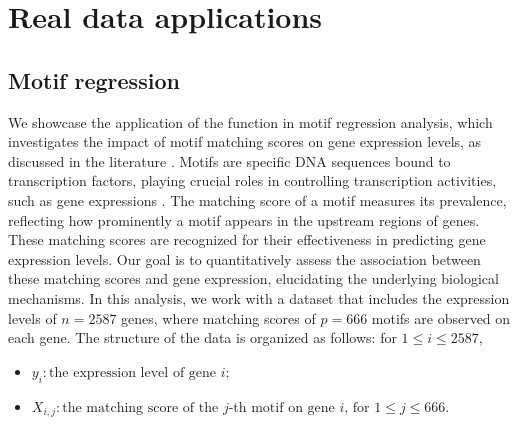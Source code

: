 
\section{Real data applications}
\label{sec: real data}

\subsection{Motif regression}
We showcase the application of the  function in motif regression analysis, which investigates the impact of motif matching scores on gene expression levels, as discussed in the literature \citep{beer2004predicting, conlon2003integrating, das2004interacting, yuan2007predicting}. Motifs are specific DNA sequences bound to transcription factors, playing crucial roles in controlling transcription activities, such as gene expressions \citep{yuan2007predicting}. The matching score of a motif measures its prevalence, reflecting how prominently a motif appears in the upstream regions of genes. These matching scores are recognized for their effectiveness in predicting gene expression levels. Our goal is to quantitatively assess the association between these matching scores and gene expression, elucidating the underlying biological mechanisms. In this analysis, we work with a dataset that includes the expression levels of $n=2587$ genes, where matching scores of $p=666$ motifs are observed on each gene. The structure of the data is organized as follows: for $1\leq i\leq 2587$,
\begin{itemize}
    \item $y_i: \textrm{the expression level of gene $i$};$
    \item $X_{i,j}: \textrm{the matching score of the $j$-th motif on gene $i$, for $1\leq j\leq 666$.}$
\end{itemize}

